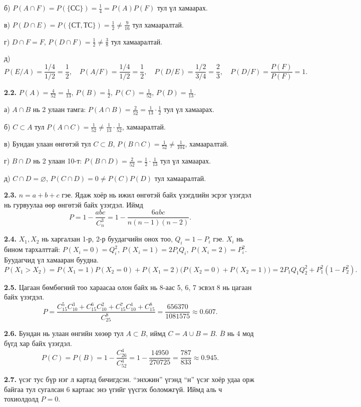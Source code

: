 \documentclass[11pt,a4paper]{article}
\newcommand{\bod}[1]{\par\medskip\noindent\textbf{#1}\quad}
\newcommand{\ol}[1]{\overline{#1}}
\begin{document}
б) $P(A\cap F)=P(\{\text{СС}\})=\frac14=P(A)P(F)$ тул үл хамаарах.

в) $P(D\cap E)=P(\{\text{СТ},\text{ТС}\})=\frac12\ne\frac{9}{16}$ тул хамааралтай.

г) $D\cap F=F$, $P(D\cap F)=\frac12\ne\frac38$ тул хамааралтай.

д) $P(E/A)=\dfrac{1/4}{1/2}=\dfrac12,\quad P(A/F)=\dfrac{1/4}{1/2}=\dfrac12,\quad P(D/E)=\dfrac{1/2}{3/4}=\dfrac23,\quad P(D/F)=\dfrac{P(F)}{P(F)}=1.$

\bod{2.2.}
$P(A)=\frac{4}{52}=\frac{1}{13}$, $P(B)=\frac12$, $P(C)=\frac1{52}$, $P(D)=\frac1{13}$.

а) $A\cap B$ нь 2 улаан тамга: $P(A\cap B)=\frac{2}{52}=\frac1{13}\cdot\frac12$ тул үл хамаарах.

б) $C\subset A$ тул $P(A\cap C)=\frac1{52}\ne\frac1{13}\cdot\frac1{52}$, хамааралтай.

в) Бундан улаан өнгөтэй тул $C\subset B$, $P(B\cap C)=\frac1{52}\ne\frac1{104}$, хамааралтай.

г) $B\cap D$ нь 2 улаан 10-т: $P(B\cap D)=\frac2{52}=\frac12\cdot\frac1{13}$ тул үл хамаарах.

д) $C\cap D=\varnothing$, $P(C\cap D)=0\ne P(C)P(D)$ тул хамааралтай.

\bod{2.3.}
$n=a+b+c$ гэе. Ядаж хоёр нь ижил өнгөтэй байх үзэгдлийн эсрэг үзэгдэл нь гурвуулаа өөр өнгөтэй байх үзэгдэл. Иймд
\[
P=1-\frac{abc}{C_n^3}=1-\frac{6abc}{n(n-1)(n-2)}.
\]

\bod{2.4.}
$X_1, X_2$ нь харгалзан 1-р, 2-р буудагчийн онох тоо, $Q_i=1-P_i$ гэе. $X_i$ нь бином тархалттай:
$P(X_i=0)=Q_i^2$, $P(X_i=1)=2P_iQ_i$, $P(X_i=2)=P_i^2$. Буудагчид үл хамааран буудна.
\[
P(X_1>X_2)=P(X_1=1)P(X_2=0)+P(X_1=2)\bigl(P(X_2=0)+P(X_2=1)\bigr)
=2P_1Q_1Q_2^2+P_1^2(1-P_2^2).
\]

\bod{2.5.}
Цагаан бөмбөгний тоо хараасаа олон байх нь 8-аас 5, 6, 7 эсвэл 8 нь цагаан байх үзэгдэл.
\[
P=\frac{C_{15}^5C_{10}^3+C_{15}^6C_{10}^2+C_{15}^7C_{10}^1+C_{15}^8}{C_{25}^8}
=\frac{656370}{1081575}\approx 0.607.
\]

\bod{2.6.}
Бундан нь улаан өнгийн хөзөр тул $A\subset B$, иймд $C=A\cup B=B$.
$\ol{B}$ нь 4 мод бүгд хар байх үзэгдэл.
\[
P(C)=P(B)=1-\frac{C_{26}^4}{C_{52}^4}=1-\frac{14950}{270725}=\frac{787}{833}\approx 0.945.
\]

\bod{2.7.}
35 үсэг тус бүр нэг л картад бичигдсэн. “энхжин” үгэнд “н” үсэг хоёр удаа орж байгаа тул сугалсан 6 картаас энэ үгийг үүсгэх боломжгүй. Иймд аль ч тохиолдолд $P=0$.
\end{document}
